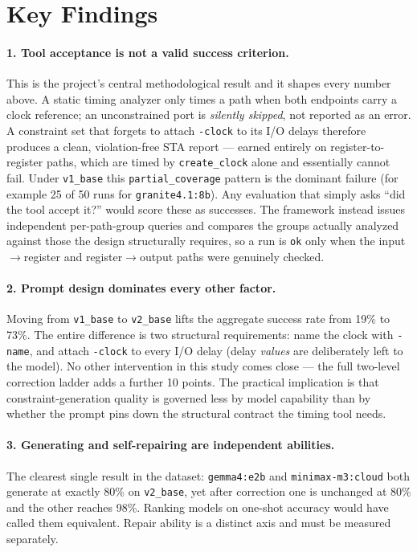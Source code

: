 \documentclass[11pt]{article}
\begin{document}
\section*{Key Findings}

\paragraph{1. Tool acceptance is not a valid success criterion.} This is the project's central methodological result and it shapes every number above. A static timing analyzer only times a path when both endpoints carry a clock reference; an unconstrained port is \emph{silently skipped}, not reported as an error. A constraint set that forgets to attach \texttt{-clock} to its I/O delays therefore produces a clean, violation-free STA report --- earned entirely on register-to-register paths, which are timed by \texttt{create\_clock} alone and essentially cannot fail. Under \texttt{v1\_base} this \texttt{partial\_coverage} pattern is the dominant failure (for example 25 of 50 runs for \texttt{granite4.1:8b}). Any evaluation that simply asks ``did the tool accept it?'' would score these as successes. The framework instead issues independent per-path-group queries and compares the groups actually analyzed against those the design structurally requires, so a run is \texttt{ok} only when the input$\to$register and register$\to$output paths were genuinely checked.

\paragraph{2. Prompt design dominates every other factor.} Moving from \texttt{v1\_base} to \texttt{v2\_base} lifts the aggregate success rate from 19\% to 73\%. The entire difference is two structural requirements: name the clock with \texttt{-name}, and attach \texttt{-clock} to every I/O delay (delay \emph{values} are deliberately left to the model). No other intervention in this study comes close --- the full two-level correction ladder adds a further 10 points. The practical implication is that constraint-generation quality is governed less by model capability than by whether the prompt pins down the structural contract the timing tool needs.

\paragraph{3. Generating and self-repairing are independent abilities.} The clearest single result in the dataset: \texttt{gemma4:e2b} and \texttt{minimax-m3:cloud} both generate at exactly 80\% on \texttt{v2\_base}, yet after correction one is unchanged at 80\% and the other reaches 98\%. Ranking models on one-shot accuracy would have called them equivalent. Repair ability is a distinct axis and must be measured separately.
\end{document}
